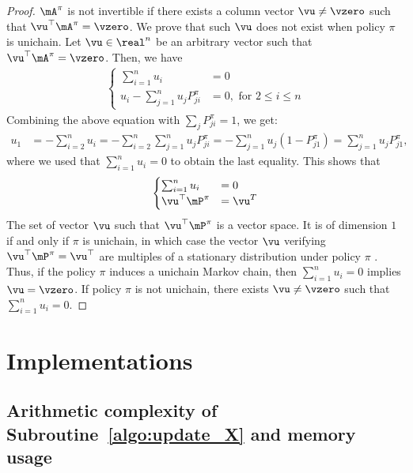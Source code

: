 \begin{proof}
    $\mA^\pi$ is not invertible if there exists a column vector $\vu\neq\vzero$ such that $\vu^\top \mA^\pi=\vzero$.
    We prove that such $\vu$ does not exist when policy $\pi$ is unichain.
    Let $\vu\in\real^n$ be an arbitrary vector such that $\vu^\top \mA^\pi=\vzero$.
    Then, we have
    \begin{align*}
        \begin{cases}
            \sum_{i=1}^{n}u_i &= 0 \\
            u_i-\sum_{j=1}^{n}u_jP_{ji}^\pi &= 0, \text{ for } 2\le i\le n
        \end{cases}
    \end{align*}
    Combining the above equation with $\sum_j P^\pi_{ji}=1$, we get:
    \begin{align*}
        u_1 &= -\sum_{i=2}^n u_i
        =-\sum_{i=2}^n\sum_{j=1}^n u_j P^\pi_{ji}
        =-\sum_{j=1}^n u_j (1-P^\pi_{j1})
        = \sum_{j=1}^n u_j P^\pi_{j1},
    \end{align*}
    where we used that $\sum_{i=1}^{n}u_i=0$ to obtain the last equality.  
    This shows that 
    \begin{align*}
        \begin{cases}
            \sum_{i=1}^{n}u_i &= 0 \\
            \vu^\top\mP^\pi &=\vu^T
        \end{cases}
    \end{align*}
    The set of vector $\vu$ such that $\vu^\top\mP^\pi$ is a vector space. It is of dimension $1$ if and only if $\pi$ is unichain, in which case the vector $\vu$ verifying $\vu^\top\mP^\pi=\vu^\top$ are multiples of a stationary distribution under policy $\pi$ \cite{puterman2014markov}. Thus, if the policy $\pi$ induces a unichain Markov chain, then $\sum_{i=1}^{n}u_i = 0$ implies $\vu = \vzero$. If policy $\pi$ is not unichain, there exists $\vu\ne\vzero$ such that $\sum_{i=1}^{n}u_i = 0$.
\end{proof}

\section{Implementations}
\label{apx:implementation}

\subsection{Arithmetic complexity of Subroutine~\ref{algo:update_X} and memory usage}

